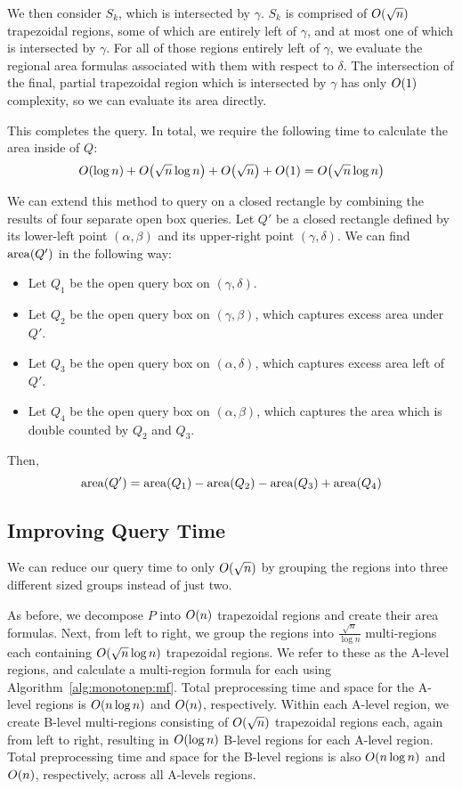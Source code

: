 We then consider $S_k$, which is intersected by $\gamma$.
$S_k$ is comprised of $O\!\left(\sqrt{n}\right)$ trapezoidal regions, some of which are entirely left of $\gamma$, and at most one of which is intersected by $\gamma$. 
For all of those regions entirely left of $\gamma$, we evaluate the regional area formulas associated with them with respect to $\delta$. 
The intersection of the final, partial trapezoidal region which is intersected by $\gamma$ has only $O\!\left(1\right)$ complexity, so we can evaluate its area directly.

This completes the query. In total, we require the following time to calculate the area inside of $Q$:
\[ 
O\!\left(\log{n}\right) + O\!\left(\sqrt{n}\log{n}\right) + O\!\left(\sqrt{n}\right) + O\!\left(1\right) = O\!\left(\sqrt{n}\log{n}\right)
\]

\noindent We can extend this method to query on a closed rectangle by combining the results of four separate open box queries.
Let $Q'$ be a closed rectangle defined by its lower-left point $(\alpha, \beta)$ and its upper-right point $(\gamma, \delta)$.
We can find $\operatorname{area}\!\left(Q'\right)$ in the following way:

\begin{itemize}
\item Let $Q_1$ be the open query box on $(\gamma, \delta)$.
\item Let $Q_2$ be the open query box on $(\gamma, \beta)$, which captures excess area under $Q'$.
\item Let $Q_3$ be the open query box on $(\alpha, \delta)$, which captures excess area left of $Q'$.
\item Let $Q_4$ be the open query box on $(\alpha, \beta)$, which captures the area which is double counted by $Q_2$ and $Q_3$.
\end{itemize}

\noindent Then,
\[
\operatorname{area}\!\left(Q'\right) = \operatorname{area}\!\left(Q_1\right) - \operatorname{area}\!\left(Q_2\right) - \operatorname{area}\!\left(Q_3\right) + \operatorname{area}\!\left(Q_4\right)
\]

\subsection{Improving Query Time}
\label{:mono2:bitfaster}

We can reduce our query time to only $O\!\left(\sqrt{n}\right)$ by grouping the regions into three different sized groups instead of just two.

As before, we decompose $P$ into $O\!\left(n\right)$ trapezoidal regions and create their area formulas.
Next, from left to right, we group the regions into $\frac{\sqrt{n}}{\log{n}}$ multi-regions each containing $O\!\left(\sqrt{n}\log{n}\right)$ trapezoidal regions.
We refer to these as the A-level regions, and calculate a multi-region formula for each using Algorithm~\ref{alg:monotonep:mf}.
Total preprocessing time and space for the A-level regions is $O\!\left(n\log{n}\right)$ and $O\!\left(n\right)$, respectively.
Within each A-level region, we create B-level multi-regions consisting of $O\!\left(\sqrt{n}\right)$ trapezoidal regions each, again from left to right, resulting in $O\!\left(\log{n}\right)$ B-level regions for each A-level region.
Total preprocessing time and space for the B-level regions is also $O\!\left(n\log{n}\right)$ and $O\!\left(n\right)$, respectively, across all A-levels regions.

